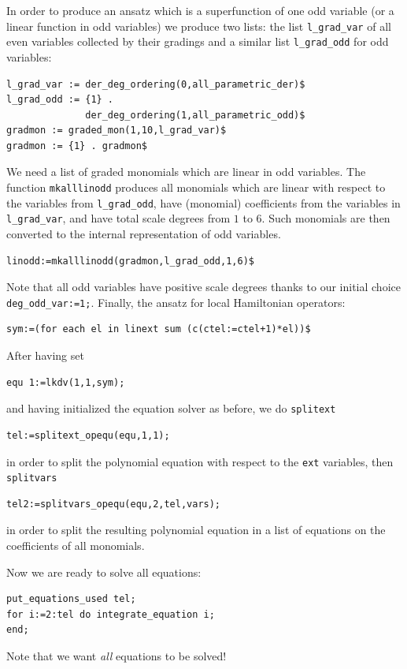 In order to produce an ansatz which is a superfunction of one odd variable (or
a linear function in odd variables) we produce two lists: the list
\texttt{l\_grad\_var} of all even variables collected by their gradings and a
similar list \texttt{l\_grad\_odd} for odd variables:
\begin{verbatim}
l_grad_var := der_deg_ordering(0,all_parametric_der)$
l_grad_odd := {1} .
              der_deg_ordering(1,all_parametric_odd)$
gradmon := graded_mon(1,10,l_grad_var)$
gradmon := {1} . gradmon$
\end{verbatim}
We need a list of graded monomials which are linear in odd variables. The
function \texttt{mkalllinodd} produces all monomials which are linear with
respect to the variables from \texttt{l\_grad\_odd}, have (monomial)
coefficients from the variables in \texttt{l\_grad\_var}, and have total scale
degrees from $1$ to $6$. Such monomials are then converted to the internal
representation of odd variables.
\hypertarget{operator:MKALLLINODD}{}
\begin{verbatim}
linodd:=mkalllinodd(gradmon,l_grad_odd,1,6)$
\end{verbatim}
Note that all odd variables have positive scale degrees thanks to our initial
choice \texttt{deg\_odd\_var:={1};}.
Finally, the ansatz for local Hamiltonian operators:
\begin{verbatim}
sym:=(for each el in linext sum (c(ctel:=ctel+1)*el))$
\end{verbatim}
After having set
\begin{verbatim}
equ 1:=lkdv(1,1,sym);
\end{verbatim}
and having initialized the equation solver as before, we do \texttt{splitext}
\hypertarget{operator:SPLITEXT_OPEQU}{}
\begin{verbatim}
tel:=splitext_opequ(equ,1,1);
\end{verbatim}
in order to split the polynomial equation with respect to the \texttt{ext}
variables, then \texttt{splitvars}
\begin{verbatim}
tel2:=splitvars_opequ(equ,2,tel,vars);
\end{verbatim}
in order to split the resulting polynomial equation in a list of equations on
the coefficients of all monomials.

Now we are ready to solve all equations:
\begin{verbatim}
put_equations_used tel;
for i:=2:tel do integrate_equation i;
end;
\end{verbatim}
Note that we want \emph{all} equations to be solved!

